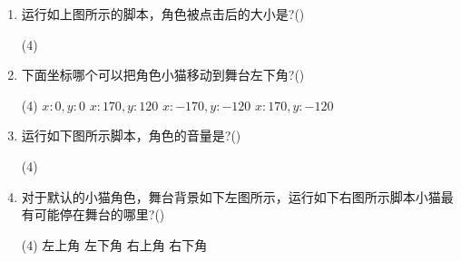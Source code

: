 \documentclass[10pt, a4paper]{article}
\begin{document}
\begin{enumerate}
        \item 运行如上图所示的脚本，角色被点击后的大小是?(\qquad)
        \begin{tasks}(4)
        \end{tasks}

        \item 下面坐标哪个可以把角色小猫移动到舞台左下角?(\qquad)
        \begin{tasks}(4)
            \task $x:0,y:0$
            \task $x:170,y:120$
            \task $x:-170,y:-120$
            \task $x:170,y:-120$
        \end{tasks}

        \item 运行如下图所示脚本，角色的音量是?(\qquad)
        \begin{tasks}(4)
        \end{tasks}

        \item 对于默认的小猫角色，舞台背景如下左图所示，运行如下右图所示脚本小猫最有可能停在舞台的哪里?(\qquad)
        \begin{tasks}(4)
            \task 左上角
            \task 左下角
            \task 右上角
            \task 右下角
        \end{tasks}


\end{enumerate}
\end{document}
